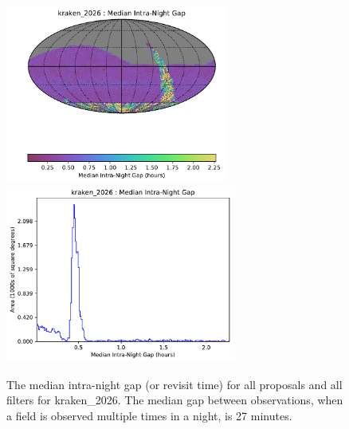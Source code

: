 \documentclass[DM,authoryear,toc]{lsstdoc}
\begin{document}
\begin{figure}[htb]
\centering
\vskip -0.0in
\includegraphics[height=2.3in]{figures/kraken_2026_Median_Intra-Night_Gap_HEAL_SkyMap.pdf}
\includegraphics[height=2.3in]{figures/kraken_2026_Median_Intra-Night_Gap_HEAL_Histogram.pdf}
\vskip -0.1in
\caption{The median intra-night gap (or revisit time) for all proposals and all filters for  kraken\_2026.
The median gap between observations, when a field is observed multiple times in a night, is 27 minutes.
\label{fig:baseline_InterGapAll}}
\end{figure}
\end{document}
